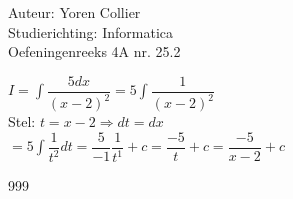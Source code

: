 \documentclass[a4paper]{article}
\newcommand{\adR}{\Rightarrow} %
\newcommand{\Lh}{\left(} %
\newcommand{\Rh}{\right)}
\newcommand{\intgrl}{\displaystyle\int} %
\begin{document}
\noindent \large Auteur: Yoren Collier \\
\noindent \large Studierichting: Informatica\\
\noindent \large Oefeningenreeks 4A nr. 25.2\\

\medskip

\normalsize

$ I =  \intgrl \dfrac{5dx}{\Lh x -2 \Rh ^2} = 5\intgrl \dfrac{1}{\Lh x -2 \Rh ^2} $\\

Stel: $t = x -2 \adR dt = dx $\\

$= 5\intgrl\dfrac{1}{t^2} dt = \dfrac{5}{-1} \dfrac{1}{t^1} +c = \dfrac{-5}{t} +c = \dfrac{-5}{x -2} +c$

\begin{thebibliography}{999}
\end{thebibliography}
\end{document}
